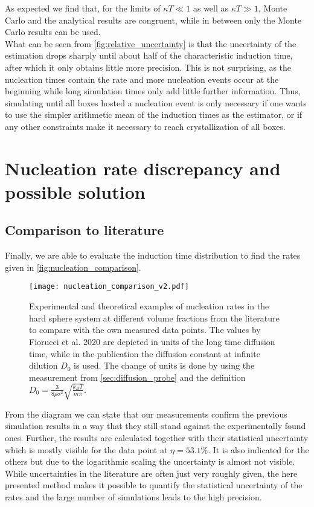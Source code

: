 As expected we find that, for the limits of $\kappa T \ll 1$ as well as $\kappa T \gg 1$, Monte Carlo and the analytical results are congruent, while in between only the Monte Carlo results can be used.\\

What can be seen from \autoref{fig:relative_uncertainty} is that the uncertainty of the estimation drops sharply until about half of the characteristic induction time, after which it only obtains little more precision. This is not surprising, as the nucleation times contain the rate and more nucleation events occur at the beginning while long simulation times only add little further information. Thus, simulating until all boxes hosted a nucleation event is only necessary if one wants to use the simpler arithmetic mean of the induction times as the estimator, or if any other constraints make it necessary to reach crystallization of all boxes.

\section{Nucleation rate discrepancy and possible solution}
\subsection{Comparison to literature}
\label{sec:nucleation_rates}
Finally, we are able to evaluate the induction time distribution to find the rates given in \autoref{fig:nucleation_comparison}.

\begin{figure}[h]
\centering
\texttt{[image: nucleation\_comparison\_v2.pdf]}
\caption[Nucleation rate comparison with literature values]{Experimental and theoretical examples of nucleation rates in the hard sphere system at different volume fractions from the literature\cite{Harland1997,He1996,schaetzel1993,Sinn2001,Auer2001,Filion2010a,Fiorucci2020a,Schilling2011} to compare with the own measured data points. The values by Fiorucci et al. 2020 are depicted in units of the long time diffusion time, while in the publication the diffusion constant at infinite dilution $D_0$ is used. The change of units is done by using the measurement from \autoref{sec:diffusion_probe} and the definition $D_0 = \frac{3}{8\rho \sigma^2} \sqrt{ \frac{k_B T}{m \pi}}$.}
\label{fig:nucleation_comparison}
\end{figure}

From the diagram we can state that our measurements confirm the previous simulation results in a way that they still stand against the experimentally found ones. Further, the results are calculated together with their statistical uncertainty which is mostly visible for the data point at $\eta = 53.1 \%$. It is also indicated for the others but due to the logarithmic scaling the uncertainty is almost not visible.\\
While uncertainties in the literature are often just very roughly given, the here presented method makes
it possible to quantify the statistical uncertainty of the rates and the large number of simulations leads to the high precision.\\

